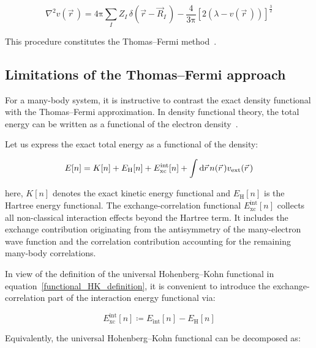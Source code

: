 \begin{equation}
    \nabla^2 v(\vec{r}\,)=4\mathrm{\pi}\sum_I Z_I\,\delta\left(\vec{r}-\vec{R}_I\,\right)-\frac{4}{3\mathrm{\pi}}\left[2\left(\lambda-v(\vec{r}\,)\right)\right]^{\frac{3}{2}}
\label{differential_form_Thomas_Fermi_equation}
\end{equation}

This procedure constitutes the Thomas--Fermi method~\cite{lieb2010stability}.

\FloatBarrier
\subsection{Limitations of the Thomas--Fermi approach}

For a many-body system,
it is instructive to contrast the exact density functional with the Thomas--Fermi approximation.
In density functional theory, the total energy can be written as a functional of the electron density~\cite{hohenberg1964inhomogeneous,jones2015density}.

Let us express the exact total energy as a functional of the density:

\begin{equation}
    E[n]=K[n]+E_\mathrm{H}[n]+E_\mathrm{xc}^\mathrm{int}[n]+\int\mathrm{d}{\vec{r}}\,n(\vec{r}\,)v_\mathrm{ext}(\vec{r}\,)
\label{functional_exact_total_energy}
\end{equation}

here, $K[n]$ denotes the exact kinetic energy functional and $E_\mathrm{H}[n]$ is the Hartree energy functional.
The exchange-correlation functional $E_\mathrm{xc}^\mathrm{int}[n]$ collects all non-classical interaction effects beyond the Hartree term.
It includes the exchange contribution originating from the antisymmetry of the many-electron wave function and the correlation contribution accounting for the remaining many-body correlations.

In view of the definition of the universal Hohenberg--Kohn functional in equation~\eqref{functional_HK_definition},
it is convenient to introduce the exchange-correlation part of the interaction energy functional via:

\begin{equation}
E_\mathrm{xc}^{\mathrm{int}}[n]\coloneqq E_\mathrm{int}[n]-E_\mathrm{H}[n]
\label{Exc_int_definition}
\end{equation}

Equivalently, the universal Hohenberg--Kohn functional can be decomposed as:

